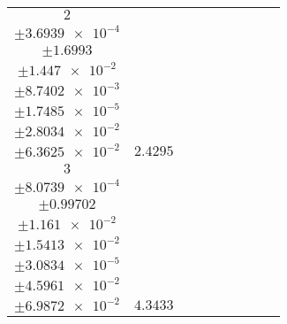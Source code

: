 \documentclass[8pt]{article}
\begin{document}
\begin{longtable}[l]{c c c c c c c c c}
$\num{2}$ & \begin{tabular}[c]{@{}c@{}}$\num{3.3707e-2}$ \\ $\pm\num{3.6939e-4}$\end{tabular} & \begin{tabular}[c]{@{}c@{}}$\num{-3.7449}$ \\ $\pm\num{1.6993}$\end{tabular} & \begin{tabular}[c]{@{}c@{}}$\num{-5.6364}$ \\ $\pm\num{1.447e-2}$\end{tabular} & \begin{tabular}[c]{@{}c@{}}$\num{2.9511e+3}$ \\ $\pm\num{8.7402e-3}$\end{tabular} & \begin{tabular}[c]{@{}c@{}}$\num{5.9039}$ \\ $\pm\num{1.7485e-5}$\end{tabular} & \begin{tabular}[c]{@{}c@{}}$\num{2.639}$ \\ $\pm\num{2.8034e-2}$\end{tabular} & \begin{tabular}[c]{@{}c@{}}$\num{4.8684}$ \\ $\pm\num{6.3625e-2}$\end{tabular} & $\num{2.4295}$\\
$\num{3}$ & \begin{tabular}[c]{@{}c@{}}$\num{6.8426e-2}$ \\ $\pm\num{8.0739e-4}$\end{tabular} & \begin{tabular}[c]{@{}c@{}}$\num{7.8196}$ \\ $\pm\num{0.99702}$\end{tabular} & \begin{tabular}[c]{@{}c@{}}$\num{-0.99932}$ \\ $\pm\num{1.161e-2}$\end{tabular} & \begin{tabular}[c]{@{}c@{}}$\num{2.9558e+3}$ \\ $\pm\num{1.5413e-2}$\end{tabular} & \begin{tabular}[c]{@{}c@{}}$\num{5.9132}$ \\ $\pm\num{3.0834e-5}$\end{tabular} & \begin{tabular}[c]{@{}c@{}}$\num{4.3272}$ \\ $\pm\num{4.5961e-2}$\end{tabular} & \begin{tabular}[c]{@{}c@{}}$\num{6.9028}$ \\ $\pm\num{6.9872e-2}$\end{tabular} & $\num{4.3433}$\\

\end{longtable}
\end{document}

